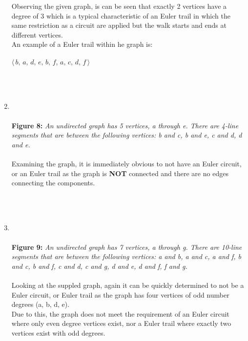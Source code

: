 \documentclass{amsart}
\theoremstyle{definition}
\theoremstyle{Exercise}
\theoremstyle{remark}
\theoremstyle{rule}
\numberwithin{equation}{section}
\begin{document}
\begin{enumerate}[label=(\alph*)]
Observing the given graph, is can be seen that exactly 2 vertices have a degree of 3 which is a typical characteristic of an Euler trail in which the same restriction as a circuit are applied but the walk starts and ends at different vertices.\\
An example of a Euler trail within he graph is:\\\\
$\langle \,b,\,a,\,d,\,e,\,b,\,f,\,a,\,c,\,d,\,f\, \rangle$
\\\\
   \newpage
~\\~\\
\item 
{}
\\\\
{\color{blue} {\bf Figure 8: } \emph{An undirected graph has 5 vertices, a through e. There are 4-line segments that are between the following vertices: b and c, b and e, c and d, d and e. 
  }
}
\\\\
Examining the graph, it is immediately obvious to not have an Euler circuit, or an Euler trail as the graph is {\bf NOT} connected and there are no edges connecting the components.
\\\\

\newpage
~\\~\\
\item 
{}
\\\\
{\color{blue} {\bf Figure 9:} \emph{An undirected graph has 7 vertices, a through g. There are 10-line segments that are between the following vertices: a and b, a and c, a and f, b and c, b and f, c and d, c and g, d and e, d and f, f and g. 
  }
}
\\\\
Looking at the suppled graph, again it can be quickly determined to not be a Euler circuit, or Euler trail as the graph has four vertices of odd number degrees (a, b, d, e).\\
Due to this, the graph does not meet the requirement of an Euler circuit where only even degree vertices exist, nor a Euler trail where exactly two vertices exist with odd degrees. 
\\\\


  \end{enumerate}
\newpage
~\\
\end{document}
